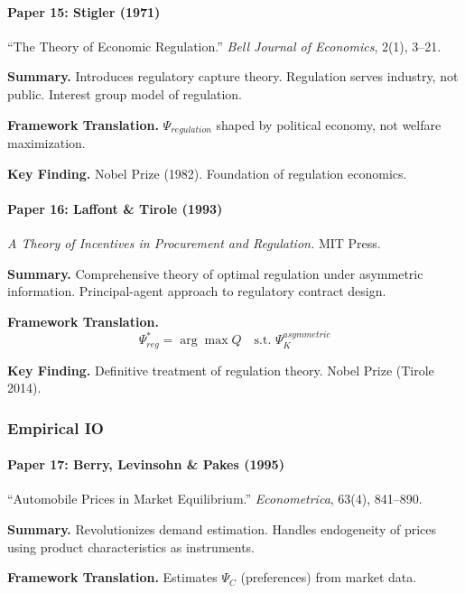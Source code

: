 \paragraph{Paper 15: Stigler (1971)}

``The Theory of Economic Regulation.''
\textit{Bell Journal of Economics}, 2(1), 3--21.

\textbf{Summary.}
Introduces regulatory capture theory. Regulation serves industry, not public.
Interest group model of regulation.

\textbf{Framework Translation.}
$\Psi_{regulation}$ shaped by political economy, not welfare maximization.

\textbf{Key Finding.}
Nobel Prize (1982). Foundation of regulation economics.

\paragraph{Paper 16: Laffont \& Tirole (1993)}

\textit{A Theory of Incentives in Procurement and Regulation.}
MIT Press.

\textbf{Summary.}
Comprehensive theory of optimal regulation under asymmetric information.
Principal-agent approach to regulatory contract design.

\textbf{Framework Translation.}
\begin{equation}
\Psi^*_{reg} = \arg\max Q \quad \text{s.t. } \Psi_K^{asymmetric}
\end{equation}

\textbf{Key Finding.}
Definitive treatment of regulation theory. Nobel Prize (Tirole 2014).

\subsubsection{Empirical IO}

\paragraph{Paper 17: Berry, Levinsohn \& Pakes (1995)}

``Automobile Prices in Market Equilibrium.''
\textit{Econometrica}, 63(4), 841--890.

\textbf{Summary.}
Revolutionizes demand estimation. Handles endogeneity of prices using 
product characteristics as instruments.

\textbf{Framework Translation.}
Estimates $\Psi_C$ (preferences) from market data.

